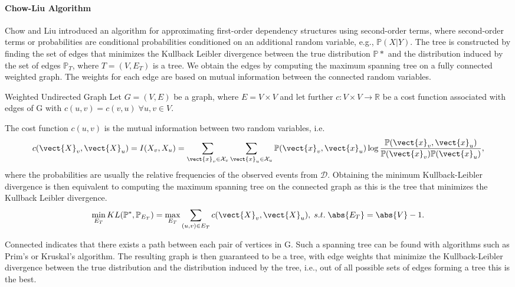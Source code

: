 \paragraph*{Chow-Liu Algorithm}
Chow and Liu introduced an algorithm\cite{chow1968approximating} for approximating first-order dependency structures using second-order terms, where second-order terms or probabilities are conditional probabilities conditioned on an additional random variable, e.g., $\mathbb{P}(X \lvert Y)$.
The tree is constructed by finding the set of edges that minimizes the Kullback Leibler divergence between the true distribution $\mathbb{P}*$ and the distribution induced by the set of edges $\mathbb{P}_T$, where $T=(V, E_T)$ is a tree.
We obtain the edges by computing the maximum spanning tree on a fully connected weighted graph.
The weights for each edge are based on mutual information between the connected random variables.

\begin{definition}{Weighted Undirected Graph}
    Let $G=(V,E)$ be a graph, where $E = V \times V$ and let further $c: V \times V \rightarrow \mathbb{R}$ be a cost function associated with edges of G with $c(u,v) = c(v,u) \; \forall u,v \in V$.
\end{definition}

The cost function $c(u,v)$ is the mutual information between two random variables, i.e. 
\begin{equation}
    c(\vect{X}_v, \vect{X}_u) = I(X_v, X_u) = \sum_{\vect{x}_v \in \mathcal{X}_v} \sum_{\vect{x}_u \in \mathcal{X}_u} \mathbb{P}(\vect{x}_v,\vect{x}_u) \log \frac{\mathbb{P}(\vect{x}_v,\vect{x}_u) }{\mathbb{P}(\vect{x}_v)  \mathbb{P}(\vect{x}_u)},
\end{equation}
where the probabilities are usually the relative frequencies of the observed events from $\mathcal{D}$.
Obtaining the minimum Kullback-Leibler divergence is then equivalent to computing the maximum spanning tree on the connected graph as this is the tree that minimizes the Kullback Leibler divergence.
\begin{equation}
    \min_{E_T} KL(\mathbb{P}^*, \mathbb{P}_{E_T}) = \max_{E_T} \sum_{(u,v) \in E_T} c(\vect{X}_v, \vect{X}_u), \; s.t. \; \abs{E_T} = \abs{V}-1 .
\end{equation}



Connected indicates that there exists a path between each pair of vertices in G. 
Such a spanning tree can be found with algorithms such as Prim's or Kruskal's algorithm.
The resulting graph is then guaranteed to be a tree, with edge weights that minimize the Kullback-Leibler divergence between the true distribution and the distribution induced by the tree, i.e., out of all possible sets of edges forming a tree this is the best.

